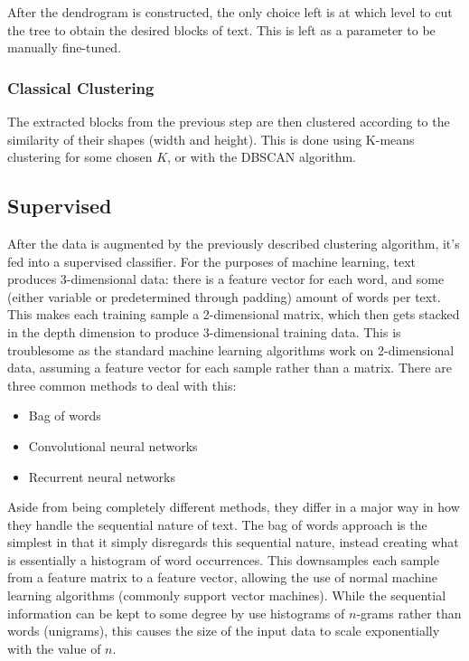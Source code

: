 After the dendrogram is constructed, the only choice left is at which level to
cut the tree to obtain the desired blocks of text. This is left as a parameter
to be manually fine-tuned.

\subsubsection{Classical Clustering}
\label{sec:sup}
The extracted blocks from the previous step are then clustered according to
the similarity of their shapes (width and height). This is done using K-means
clustering for some chosen $K$, or with the DBSCAN algorithm.

\subsection{Supervised}

After the data is augmented by the previously described clustering algorithm,
it's fed into a supervised classifier. For the purposes of machine learning,
text produces 3-dimensional data: there is a feature vector for each word, and
some (either variable or predetermined through padding) amount of words per
text. This makes each training sample a 2-dimensional matrix, which then gets
stacked in the depth dimension to produce 3-dimensional training data. This is
troublesome as the standard machine learning algorithms work on 2-dimensional
data, assuming a feature vector for each sample rather than a matrix. There are
three common methods to deal with this:
\begin{itemize}
\item Bag of words
\item Convolutional neural networks
\item Recurrent neural networks
\end{itemize}

Aside from being completely different methods, they differ in a major way in how
they handle the sequential nature of text. The bag of words approach is the
simplest in that it simply disregards this sequential nature, instead creating
what is essentially a histogram of word occurrences. This downsamples each
sample from a feature matrix to a feature vector, allowing the use of normal
machine learning algorithms (commonly support vector machines). While the
sequential information can be kept to some degree by use histograms of $n$-grams
rather than words (unigrams), this causes the size of the input data to scale
exponentially with the value of $n$.

